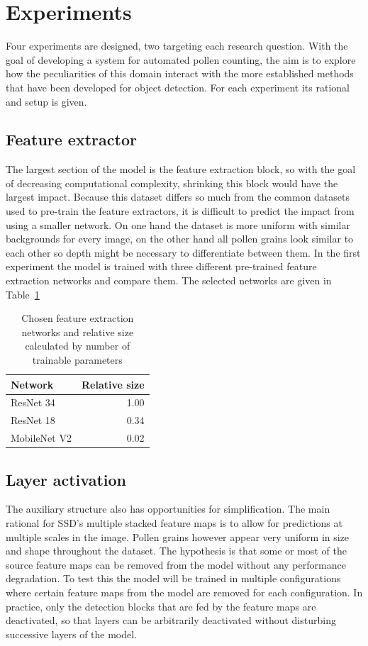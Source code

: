 \section{Experiments}\label{sec:method-experiments}
Four experiments are designed, two targeting each research question.
With the goal of developing a system for automated pollen counting, the aim is to explore how the peculiarities of this domain interact with the more established methods that have been developed for object detection.
For each experiment its rational and setup is given.

\subsection{Feature extractor}
The largest section of the model is the feature extraction block, so with the goal of decreasing computational complexity, shrinking this block would have the largest impact.
Because this dataset differs so much from the common datasets used to pre-train the feature extractors, it is difficult to predict the impact from using a smaller network.
On one hand the dataset is more uniform with similar backgrounds for every image, on the other hand all pollen grains look similar to each other so depth might be necessary to differentiate between them.
In the first experiment the model is trained with three different pre-trained feature extraction networks and compare them.
The selected networks are given in Table~\ref{tab:ex01}

\begin{table}[htbp]\centering
\caption[Feature extraction networks]{Chosen feature extraction networks and relative size calculated by number of trainable parameters}%
\label{tab:ex01}
\begin{tabular}{@{}lr@{}}\toprule
  Network & Relative size \\
  \midrule
     ResNet 34 & 1.00  \\
     ResNet 18 & 0.34  \\
  MobileNet V2 & 0.02  \\
  \bottomrule
\end{tabular}
\end{table}

\subsection{Layer activation}
The auxiliary structure also has opportunities for simplification.
The main rational for SSD's multiple stacked feature maps is to allow for predictions at multiple scales in the image.
Pollen grains however appear very uniform in size and shape throughout the dataset.
The hypothesis is that some or most of the source feature maps can be removed from the model without any performance degradation.
To test this the model will be trained in multiple configurations where certain feature maps from the model are removed for each configuration.
In practice, only the detection blocks that are fed by the feature maps are deactivated, so that layers can be arbitrarily deactivated without disturbing successive layers of the model.

